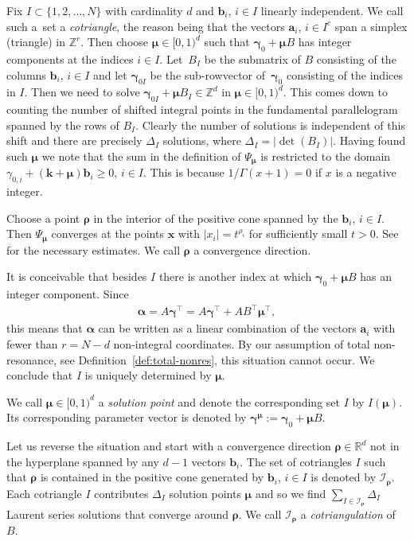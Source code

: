 Fix $I\subset\{1,2,\dots,N\}$ with cardinality $d$ and $\bm{b}_i$, $i\in I$ linearly
independent. We call such a~set a {\it cotriangle}, the reason being that
the vectors $\bm{a}_i$, $i\in I^c$ span a simplex (triangle) in $\mathbb{Z}^r$.
Then choose $\bm\mu\in[0,1)^d$ such that $\bm\gamma_0+\bm\mu B$ has integer components at the indices $i\in I$. Let~$B_I$ be the submatrix of $B$ consisting of the
columns $\bm{b}_i$, $i\in I$ and let $\bm\gamma_{0I}$ be the sub-rowvector of~$\bm{\gamma}_0$ consisting of the indices in $I$. Then we need to solve $\bm\gamma_{0I}+\bm\mu B_I\in\mathbb{Z}^d$ in $\bm\mu\in
[0,1)^d$. This comes down to counting the number of shifted integral points in the fundamental
parallelogram spanned by the rows of $B_I$. Clearly the number of solutions is independent of this shift and there are precisely $\Delta_I$ solutions, where $\Delta_I=|\det(B_I)|$. Having found such $\bm\mu$ we note that the sum in
the definition of $\Psi_{\bm\mu}$ is restricted to the domain $\gamma_{0,i}+(\bm{k}+\bm\mu)
\bm{b}_i\ge0$, $i\in I$. This is because $1/\Gamma(x+1)=0$ if $x$ is a negative integer.

Choose a point $\bm\rho$ in the interior of the positive cone spanned by the $\bm{b}_i$, $i\in I$.
Then $\Psi_{\bm\mu}$ converges at the points $\bm{x}$ with $|x_i|=t^{\rho_i}$ for
sufficiently small $t>0$. See \cite{Beu11} for the necessary estimates.
We call $\bm\rho$ a convergence direction.

It is conceivable that besides $I$ there is another index at which $\bm\gamma_0+\bm\mu B$ has
an integer component. Since
\begin{gather*}
\bm\alpha=A\bm\gamma^\intercal=A\bm\gamma^\intercal+AB^\intercal\bm\mu^\intercal,
\end{gather*}
this means that $\bm\alpha$ can be written as a linear combination of the vectors $\bm{a}_i$
with fewer than $r=N-d$ non-integral coordinates. By our assumption of total non-resonance,
see Definition~\ref{def:total-nonres}, this situation cannot occur. We conclude that $I$
is uniquely determined by $\bm\mu$.

\begin{Definition}
We call $\bm\mu\in[0,1)^d$ a {\it solution point} and denote the corresponding set $I$ by $I(\bm\mu)$. Its corresponding parameter vector is denoted by $\bm{\gamma}^{\bm{\mu}} := \bm\gamma_0+\bm\mu B$.
\end{Definition}

Let us reverse the situation and start with a convergence direction $\bm\rho\in\mathbb{R}^d$
not in the hyperplane spanned by any $d-1$ vectors $\bm{b}_i$. The set of cotriangles
$I$ such that $\bm\rho$ is contained in the positive cone generated by $\bm{b}_i$, $i\in I$
is denoted by $\mathcal{I}_{\bm\rho}$. Each cotriangle $I$ contributes $\Delta_I$ solution
points $\bm\mu$ and so we find $\sum_{I\in\mathcal{I}_{\bm\rho}}\Delta_I$ Laurent series
solutions that converge around $\bm\rho$. We call $\mathcal{I}_{\bm\rho}$ a
{\it cotriangulation} of $B$.

